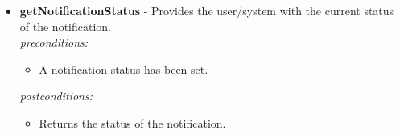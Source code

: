 \documentclass[a4paper,12pt]{article}
\begin{document}
\begin{itemize}
		\item \textbf{getNotificationStatus} -  Provides the user/system with the current status of the notification.\\[0.5cm]
		\textit{preconditions:}
		\begin{itemize}
			\item A notification status has been set.
		\end{itemize}
		
		\textit{postconditions:}
		\begin{itemize}
			\item Returns the status of the notification.\\[0.5cm]
		\end{itemize}
	\end{itemize}
\end{document}
